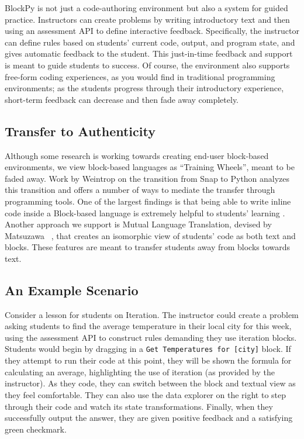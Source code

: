 \documentclass{sig-alternate}
\begin{document}
BlockPy is not just a code-authoring environment but also a system for guided practice.
Instructors can create problems by writing introductory text and then using an assessment API to define interactive feedback.
Specifically, the instructor can define rules based on students' current code, output, and program state, and gives automatic feedback to the student.
This just-in-time feedback and support is meant to guide students to success.
Of course, the environment also supports free-form coding experiences, as you would find in traditional programming environments; as the students progress through their introductory experience, short-term feedback can decrease and then fade away completely.

\subsection{Transfer to Authenticity}

Although some research is working towards creating end-user block-based environments, we view block-based languages as ``Training Wheels'', meant to be faded away.
Work by Weintrop on the transition from Snap to Python analyzes this transition and offers a number of ways to mediate the transfer through programming tools. 
One of the largest findings is that being able to write inline code inside a Block-based language is extremely helpful to students' learning \cite{Weintrop}.
Another approach we support is Mutual Language Translation, devised by Matsuzawa ~\cite{Matsuzawa}, that creates an isomorphic view of students' code as both text and blocks.
These features are meant to transfer students away from blocks towards text.

\subsection{An Example Scenario}

Consider a lesson for students on Iteration.
The instructor could create a problem asking students to find the average temperature in their local city for this week, using the assessment API to construct rules demanding they use iteration blocks.
Students would begin by dragging in a \texttt{Get Temperatures for [city]} block.
If they attempt to run their code at this point, they will be shown the formula for calculating an average, highlighting the use of iteration (as provided by the instructor).
As they code, they can switch between the block and textual view as they feel comfortable.
They can also use the data explorer on the right to step through their code and watch its state transformations.
Finally, when they successfully output the answer, they are given positive feedback and a satisfying green checkmark.
	
\end{document}
